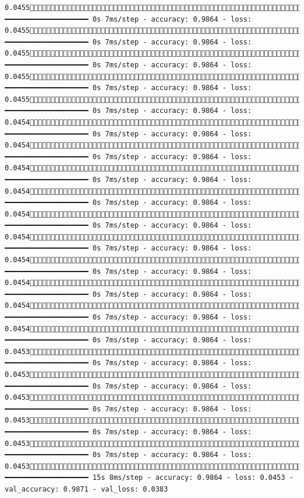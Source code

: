\documentclass[
  letterpaper,
  DIV=11,
  numbers=noendperiod]{scrreprt}
\begin{document}
\begin{verbatim}
0.04551752/1875 ━━━━━━━━━━━━━━━━━━━━ 0s 7ms/step - accuracy: 0.9864 - loss: 0.04551759/1875 ━━━━━━━━━━━━━━━━━━━━ 0s 7ms/step - accuracy: 0.9864 - loss: 0.04551765/1875 ━━━━━━━━━━━━━━━━━━━━ 0s 7ms/step - accuracy: 0.9864 - loss: 0.04551772/1875 ━━━━━━━━━━━━━━━━━━━━ 0s 7ms/step - accuracy: 0.9864 - loss: 0.04551778/1875 ━━━━━━━━━━━━━━━━━━━━ 0s 7ms/step - accuracy: 0.9864 - loss: 0.04541786/1875 ━━━━━━━━━━━━━━━━━━━━ 0s 7ms/step - accuracy: 0.9864 - loss: 0.04541793/1875 ━━━━━━━━━━━━━━━━━━━━ 0s 7ms/step - accuracy: 0.9864 - loss: 0.04541799/1875 ━━━━━━━━━━━━━━━━━━━━ 0s 7ms/step - accuracy: 0.9864 - loss: 0.04541805/1875 ━━━━━━━━━━━━━━━━━━━━ 0s 7ms/step - accuracy: 0.9864 - loss: 0.04541810/1875 ━━━━━━━━━━━━━━━━━━━━ 0s 7ms/step - accuracy: 0.9864 - loss: 0.04541816/1875 ━━━━━━━━━━━━━━━━━━━━ 0s 7ms/step - accuracy: 0.9864 - loss: 0.04541821/1875 ━━━━━━━━━━━━━━━━━━━━ 0s 7ms/step - accuracy: 0.9864 - loss: 0.04541827/1875 ━━━━━━━━━━━━━━━━━━━━ 0s 7ms/step - accuracy: 0.9864 - loss: 0.04541833/1875 ━━━━━━━━━━━━━━━━━━━━ 0s 7ms/step - accuracy: 0.9864 - loss: 0.04541839/1875 ━━━━━━━━━━━━━━━━━━━━ 0s 7ms/step - accuracy: 0.9864 - loss: 0.04531846/1875 ━━━━━━━━━━━━━━━━━━━━ 0s 7ms/step - accuracy: 0.9864 - loss: 0.04531854/1875 ━━━━━━━━━━━━━━━━━━━━ 0s 7ms/step - accuracy: 0.9864 - loss: 0.04531861/1875 ━━━━━━━━━━━━━━━━━━━━ 0s 7ms/step - accuracy: 0.9864 - loss: 0.04531868/1875 ━━━━━━━━━━━━━━━━━━━━ 0s 7ms/step - accuracy: 0.9864 - loss: 0.04531875/1875 ━━━━━━━━━━━━━━━━━━━━ 0s 7ms/step - accuracy: 0.9864 - loss: 0.04531875/1875 ━━━━━━━━━━━━━━━━━━━━ 15s 8ms/step - accuracy: 0.9864 - loss: 0.0453 - val_accuracy: 0.9871 - val_loss: 0.0383

\end{verbatim}
\end{document}
